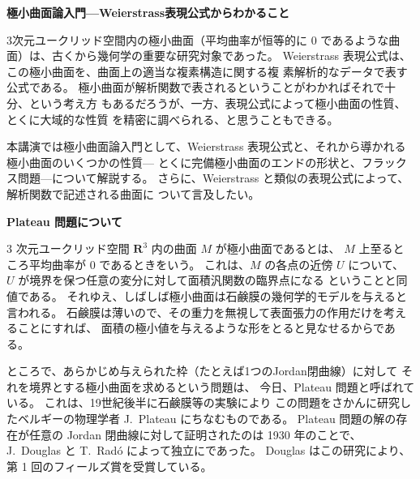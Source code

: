 \documentclass[uplatex,dvipdfmx]{jlreq}
\begin{document}
\begin{center}
{\Large\bfseries 極小曲面論入門---Weierstrass表現公式からわかること}

\hspace*{\fill}{\large\bfseries 山田 光太郎（九大・数理）}
\end{center}

\bigskip

3次元ユークリッド空間内の極小曲面（平均曲率が恒等的に $0$ であるような曲
面）は、古くから幾何学の重要な研究対象であった。
Weierstrass 表現公式は、この極小曲面を、曲面上の適当な複素構造に関する複
素解析的なデータで表す公式である。
極小曲面が解析関数で表されるということがわかればそれで十分、という考え方
もあるだろうが、一方、表現公式によって極小曲面の性質、とくに大域的な性質
を精密に調べられる、と思うこともできる。

本講演では極小曲面論入門として、Weierstrass 表現公式と、それから導かれる
極小曲面のいくつかの性質---
とくに完備極小曲面のエンドの形状と、フラックス問題---について解説する。
さらに、Weierstrass と類似の表現公式によって、解析関数で記述される曲面に
ついて言及したい。

\newpage

\begin{center}
{\Large\bfseries Plateau 問題について}

\hspace*{\fill}{\large\bfseries 小磯 深幸（京教大・教育）}
\end{center}

\bigskip

3 次元ユークリッド空間 ${\mathbf R}^3$ 内の曲面 $M$ が極小曲面であるとは、
$M$ 上至るところ平均曲率が $0$ であるときをいう。
これは、$M$ の各点の近傍 $U$ について、
$U$ が境界を保つ任意の変分に対して面積汎関数の臨界点になる
ということと同値である。
それゆえ、しばしば極小曲面は石鹸膜の幾何学的モデルを与えると言われる。
石鹸膜は薄いので、その重力を無視して表面張力の作用だけを考えることにすれば、
面積の極小値を与えるような形をとると見なせるからである。

ところで、あらかじめ与えられた枠（たとえば1つのJordan閉曲線）に対して
それを境界とする極小曲面を求めるという問題は、
今日、Plateau 問題と呼ばれている。
これは、19世紀後半に石鹸膜等の実験により
この問題をさかんに研究したベルギーの物理学者 J.~Plateau にちなむものである。
Plateau 問題の解の存在が任意の Jordan 閉曲線に対して証明されたのは
1930 年のことで、J.~Douglas と T.~Radó によって独立にであった。
Douglas はこの研究により、第 1 回のフィールズ賞を受賞している。
\end{document}
